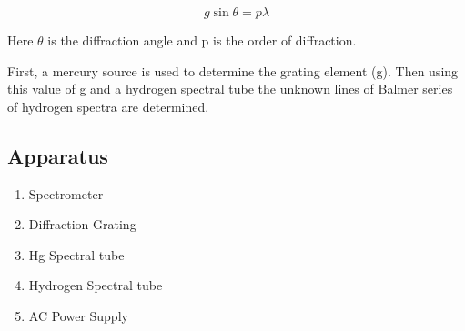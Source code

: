 \begin{equation}
    g\sin\theta = p\lambda
    \label{eqn:2}
\end{equation}

Here $\theta$ is the diffraction angle and p  is the order of diffraction.

First, a mercury
source is used to determine the grating
element (g). Then using this value of g and a
hydrogen spectral tube the unknown lines of
Balmer series of hydrogen spectra are
determined.

\subsection*{Apparatus}

\begin{enumerate}
    \item Spectrometer
    \item Diffraction Grating
    \item Hg Spectral tube
    \item Hydrogen Spectral tube
    \item AC Power Supply
\end{enumerate}